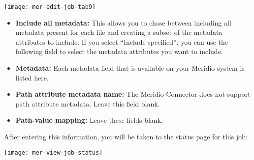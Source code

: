 \texttt{[image: mer-edit-job-tab9]}

\begin{itemize}

\item \textbf{Include all metadata:} This allows you to chose between including all metadata present for each file and creating a subset of the metadata attributes to include. If you select ``Include specified'', you can use the following field to select the metadata attributes you want to include.

\item \textbf{Metadata:} Each metadata field that is available on your Meridio system is listed here.

\item \textbf{Path attribute metadata name:} The Meridio Connector does not support path attribute metadata. Leave this field blank.

\item \textbf{Path-value mapping:} Leave these fields blank.

\end{itemize}


After entering this information, you will be taken to the status page
for this job:

\texttt{[image: mer-view-job-status]}

